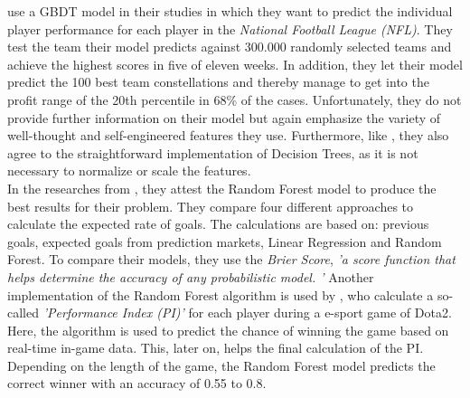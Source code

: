 \citet{landers_machine_2017} use a GBDT model in their studies in which they want to predict the individual player performance for each player in the \emph{National Football League (NFL)}. They test the team their model predicts against 300.000 randomly selected teams and achieve the highest scores in five of eleven weeks. In addition, they let their model predict the 100 best team constellations and thereby manage to get into the profit range of the 20th percentile in 68\% of the cases. Unfortunately, they do not provide further information on their model but again emphasize the variety of well-thought and self-engineered features they use. Furthermore, like \citeauthor{deng_analysis_2020}, they also agree to the straightforward implementation of Decision Trees, as it is not necessary to normalize or scale the features. \parencite[cf.][, p. 6]{landers_machine_2017} \\
In the researches from \citet{shah_poisson_2021}, they attest the Random Forest model to produce the best results for their problem. They compare four different approaches to calculate the expected rate of goals. The calculations are based on: previous goals, expected goals from prediction markets, Linear Regression and Random Forest. To compare their models, they use the \emph{Brier Score}, \emph{'a score function that helps determine the accuracy of any probabilistic model. '} \parencite[, p. 7]{shah_poisson_2021} Another implementation of the Random Forest algorithm is used by \citet{demediuk_performance_2021}, who calculate a so-called \emph{'Performance Index (PI)'} for each player during a e-sport game of Dota2. Here, the algorithm is used to predict the chance of winning the game based on real-time in-game data. This, later on, helps the final calculation of the PI. Depending on the length of the game, the Random Forest model predicts the correct winner with an accuracy of 0.55 to 0.8. \\
